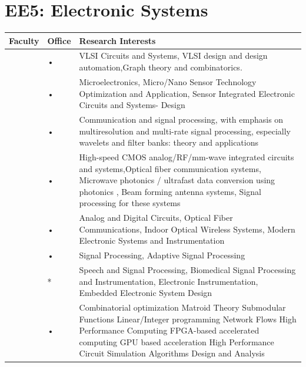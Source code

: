 \documentclass[openany]{book} %
\begin{document}
\section{EE5: Electronic Systems}
\begin{tabular}{p{3.5cm} p{3.5cm}p{9cm}}
\hline 
\hline 
Faculty  & Office  & Research Interests \\ 
\hline
\href{https://www.ee.iitb.ac.in/~madhav/}{\color{blue}{Prof. Madhav P. Desai}} & • & VLSI Circuits and Systems, VLSI design and design automation,Graph theory and combinatorics.\\ 
\hline 
\href{https://www.ee.iitb.ac.in/web/people/faculty/home/sdgupta}{\color{blue}{Prof. Siddhartha P. Duttagupta }}& • & Microelectronics, Micro/Nano Sensor Technology Optimization and Application, Sensor Integrated Electronic Circuits and Systems- Design \\ 
\hline 
\href{https://www.ee.iitb.ac.in/wiki/faculty/vmgadre}{\color{blue}{Prof. Vikram M. Gadre}} & • & Communication and signal processing, with emphasis on multiresolution and multi-rate signal processing, especially wavelets and filter banks: theory and applications \\ 
\hline 
\href{https://www.ee.iitb.ac.in/wiki/faculty/shalabh}{\color{blue}{Prof. Shalabh Gupta }}& • & High-speed CMOS analog/RF/mm-wave integrated circuits and systems,Optical fiber communication systems, Microwave photonics / ultrafast data  conversion using photonics , Beam forming antenna systems, Signal processing for these systems \\ 
\hline 
\href{https://www.ee.iitb.ac.in/wiki/faculty/jjohn}{\color{blue}{Prof. Joseph John}} & • & Analog and Digital Circuits, Optical Fiber Communications, Indoor Optical Wireless Systems, Modern Electronic Systems and Instrumentation \\ 
\hline 
\href{https://www.ee.iitb.ac.in/wiki/faculty/merchant}{\color{blue}{Prof. Shabbir Merchant }}& • & Signal Processing, Adaptive Signal Processing\\ 
\hline 
\href{https://www.ee.iitb.ac.in/~pcpandey/}{\color{blue}{Prof. Prem C. Pandey}} & *  &  Speech and Signal Processing, Biomedical Signal Processing and Instrumentation, Electronic Instrumentation, Embedded Electronic System Design\\ 
\hline 
\href{https://www.ee.iitb.ac.in/wiki/faculty/patkar}{\color{blue}{Prof. Sachin Patkar}} & • & Combinatorial optimization Matroid Theory Submodular Functions
Linear/Integer programming Network Flows High Performance Computing FPGA-based accelerated computing GPU based acceleration High Performance Circuit Simulation Algorithms Design and Analysis \\ 

\end{tabular}
\end{document}

